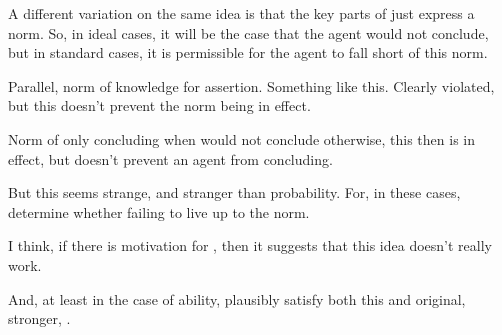 \begin{note}
  A different variation on the same idea is that the key parts of \zS{} just express a norm.
  So, in ideal cases, it will be the case that the agent would not conclude, but in standard cases, it is permissible for the agent to fall short of this norm.

  Parallel, norm of knowledge for assertion.
  Something like this.
  Clearly violated, but this doesn't prevent the norm being in effect.

  Norm of only concluding when would not conclude otherwise, this then is in effect, but doesn't prevent an agent from concluding.

  But this seems strange, and stranger than probability.
  For, in these cases, determine whether failing to live up to the norm.

  I think, if there is motivation for \zS{}, then it suggests that this idea doesn't really work.

  And, at least in the case of ability, plausibly satisfy both this and original, stronger, \qzS{}.
\end{note}



